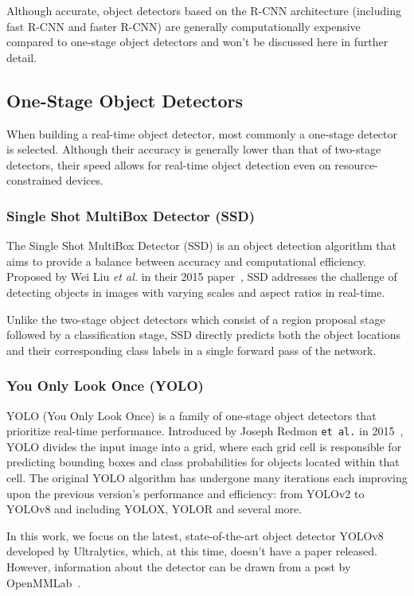 Although accurate, object detectors based on the R-CNN architecture (including
fast R-CNN and faster R-CNN) are generally computationally expensive compared to
one-stage object detectors and won't be discussed here in further detail.


\subsection{One-Stage Object Detectors}

When building a real-time object detector, most commonly a one-stage detector is
selected. Although their accuracy is generally lower than that of two-stage
detectors, their speed allows for real-time object detection even on
resource-constrained devices.

\subsubsection{Single Shot MultiBox Detector (SSD)}

The Single Shot MultiBox Detector (SSD) is an object detection algorithm that
aims to provide a balance between accuracy and computational efficiency.
Proposed by Wei Liu \textit{et al.} in their 2015 paper~\cite{Liu2015}, SSD
addresses the challenge of detecting objects in images with varying scales and
aspect ratios in real-time.

Unlike the two-stage object detectors which consist of a region proposal stage
followed by a classification stage, SSD directly predicts both the object
locations and their corresponding class labels in a single forward pass of the
network.

\subsubsection{You Only Look Once (YOLO)}

YOLO (You Only Look Once) is a family of one-stage object detectors that
prioritize real-time performance. Introduced by Joseph Redmon \texttt{et al.} in
2015~\cite{Redmon2015}, YOLO divides the input image into a grid, where each
grid cell is responsible for predicting bounding boxes and class probabilities
for objects located within that cell. The original YOLO algorithm has undergone
many iterations each improving upon the previous version's performance and
efficiency: from YOLOv2 to YOLOv8 and including YOLOX, YOLOR and several more.

In this work, we focus on the latest, state-of-the-art object
detector YOLOv8~\cite{YOLOv8} developed by Ultralytics, which, at this time, doesn't
have a paper released. However, information about the detector can be drawn from
a post by OpenMMLab~\cite{YOLOv8OpenMMLab}.

